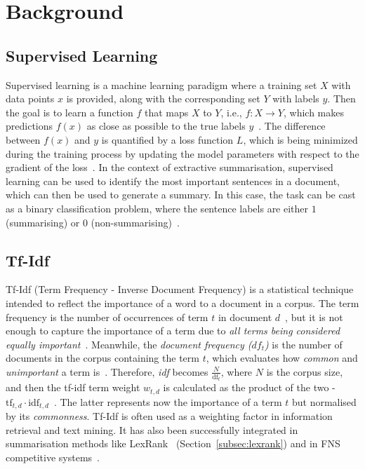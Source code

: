 \section{Background}\label{sec:background}

\subsection{Supervised Learning}\label{subsec:supervised_learning}
Supervised learning is a machine learning paradigm where a training set $X$ with data points $x$ is provided, along with the corresponding set $Y$ with labels $y$.
Then the goal is to learn a function $f$ that maps $X$ to $Y$, i.e., $f: X \rightarrow Y$, which makes predictions $f(x)$ as close as possible to the true labels $y$~\cite{sammut2011encyclopedia}.
The difference between $f(x)$ and $y$ is quantified by a loss function $L$, which is being minimized during the training process by updating the model parameters with respect to the gradient of the loss~\cite{Goodfellow-et-al-2016}.
In the context of extractive summarisation, supervised learning can be used to identify the most important sentences in a document, which can then be used to generate a summary.
In this case, the task can be cast as a binary classification problem, where the sentence labels are either $1$ (summarising) or $0$ (non-summarising)~\cite{manning_raghavan_schutze_2008}.



\subsection{Tf-Idf}\label{subsec:tfidf}
Tf-Idf (Term Frequency - Inverse Document Frequency) is a statistical technique intended to reflect the importance of a word to a document in a corpus.
The term frequency is the number of occurrences of term $t$ in document $d$~\cite{luhn1957termfreq}, but it is not enough to capture the importance of a term due to \emph{all terms being considered equally important}~\cite{manning_raghavan_schutze_2008}.
Meanwhile, the \emph{document frequency ($df_{t}$)} is the number of documents in the corpus containing the term $t$, which evaluates how \emph{common} and \emph{unimportant} a term is~\cite{leskovec_rajaraman_ullman_2020}.
Therefore, \emph{idf} becomes $\frac{N}{\text{df}_{t}}$, where $N$ is the corpus size, and then the tf-idf term weight $w_{t,d}$ is calculated as the product of the two - $\text{tf}_{t,d} \cdot \text{idf}_{t,d}$~\cite{jurafsky2000}.
The latter represents now the importance of a term $t$ but normalised by its \emph{commonness}.
Tf-Idf is often used as a weighting factor in information retrieval and text mining.
It has also been successfully integrated in summarisation methods like LexRank~\cite{Erkan2004LexRankGC} (Section~\ref{subsec:lexrank}) and in FNS competitive systems~\cite{litvak2021tiber, el-haj-ogden-2022-financial}.

